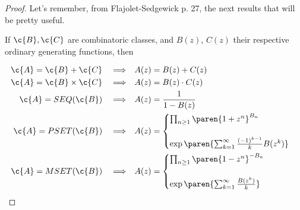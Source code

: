 \begin{proof}
    Let's remember, from Flajolet-Sedgewick p. 27, the next results that will be pretty useful.
    
    If $\c{B}, \c{C}$ are combinatoric classes, and $B(z)$, $C(z)$ their respective ordinary generating functions, then
    
    \begin{align}\label{flajolet27}
            \c{A} = \c{B} + \c{C}       &&& \Longrightarrow &&   A(z) = B(z) + C(z)                                                          \\
            \c{A} = \c{B} \times \c{C}  &&& \Longrightarrow &&   A(z) = B(z) \cdot C(z)                                                      \\
            \c{A} = SEQ(\c{B})          &&& \Longrightarrow &&   A(z) = \frac{1}{1 - B(z)}                                                   \\
            \c{A} = PSET(\c{B})         &&& \Longrightarrow &&   A(z) = \begin{cases}
                                                                            \prod_{n \geq 1} \paren{1 + z^n}^{B_n}                      \\
                                                                                                                                        \\
                                                                            \exp\paren{ \sum_{k=1}^\infty \frac{(-1)^{k-1}}{k}B(z^k)}
                                                                       \end{cases}                                                          \\
            \c{A} = MSET(\c{B})         &&& \Longrightarrow &&   A(z) = \begin{cases}
                                                                            \prod_{n \geq 1} \paren{1 - z^n}^{-B_n}                      \\
                                                                                                                                         \\
                                                                            \exp\paren{ \sum_{k=1}^\infty \frac{B(z^k)}{k}}
                                                                       \end{cases}                                                          \\
    \end{align}
    

\end{proof}
